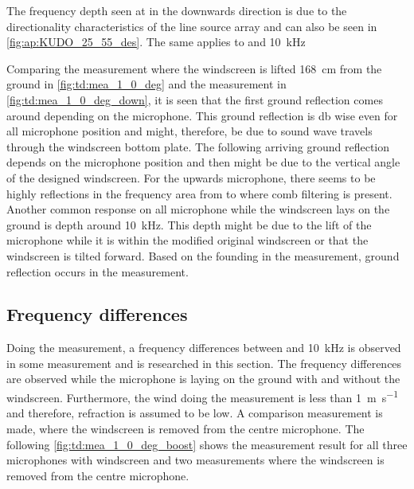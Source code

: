 
The frequency depth seen at  in the downwards direction is due to the directionality characteristics of the line source array and can also be seen in \autoref{fig:ap:KUDO_25_55_des}. The same applies to  and \SI{10}{\kilo\hertz}

Comparing the measurement where the windscreen is lifted \SI{168}{\centi\meter} from the ground in \autoref{fig:td:mea_1_0_deg} and the measurement in \autoref{fig:td:mea_1_0_deg_down}, it is seen that the first ground reflection comes around  depending on the microphone. This ground reflection is \si{\decibel} wise even for all microphone position and might, therefore, be due to sound wave travels through the windscreen bottom plate. The following arriving ground reflection depends on the microphone position and then might be due to the vertical angle of the designed windscreen. For the upwards microphone, there seems to be highly reflections in the frequency area from  to  where comb filtering is present. 
Another common response on all microphone while the windscreen lays on the ground is depth around \SI{10}{\kilo\hertz}. This depth might be due to the lift of the microphone while it is within the modified original windscreen or that the windscreen is tilted forward. Based on the founding in the measurement, ground reflection occurs in the measurement.


\subsection{Frequency differences}\label{sec:des:freq_boost}
Doing the measurement, a frequency differences between  and \SI{10}{\kilo\hertz} is observed in some measurement and is researched in this section. The frequency differences are observed while the microphone is laying on the ground with and without the windscreen. Furthermore, the wind doing the measurement is less than \SI{1}{\meter\per\second} and therefore, refraction is assumed to be low. A comparison measurement is made, where the windscreen is removed from the centre microphone. The following \autoref{fig:td:mea_1_0_deg_boost} shows the measurement result for all three microphones with windscreen and two measurements where the windscreen is removed from the centre microphone. 

